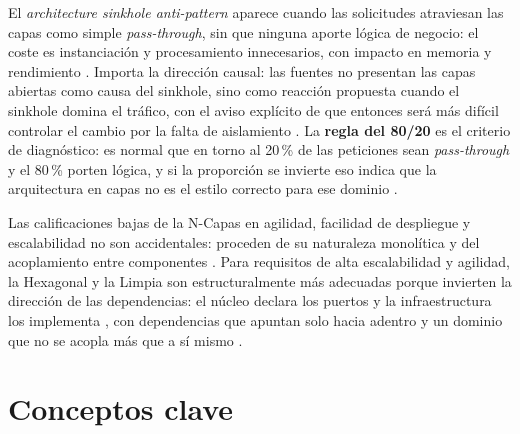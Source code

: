 El \emph{architecture sinkhole anti-pattern} aparece cuando las solicitudes atraviesan las capas
como simple \emph{pass-through}, sin que ninguna aporte lógica de negocio: el coste es
instanciación y procesamiento innecesarios, con impacto en memoria y rendimiento
\parencite[cap.~10]{richardsford2020}. Importa la dirección causal: las fuentes no presentan las
capas abiertas como causa del sinkhole, sino como reacción propuesta cuando el sinkhole domina
el tráfico, con el aviso explícito de que entonces será más difícil controlar el cambio por la
falta de aislamiento \parencite[7]{richards2015}. La \textbf{regla del 80/20} es el criterio de
diagnóstico: es normal que en torno al 20\,\% de las peticiones sean \emph{pass-through} y el
80\,\% porten lógica, y si la proporción se invierte eso indica que la arquitectura en capas no
es el estilo correcto para ese dominio \parencite[7]{richards2015}.

Las calificaciones bajas de la N-Capas en agilidad, facilidad de despliegue y escalabilidad no
son accidentales: proceden de su naturaleza monolítica y del acoplamiento entre componentes
\parencite[8-9]{richards2015}. Para requisitos de alta escalabilidad y agilidad, la Hexagonal y
la Limpia son estructuralmente más adecuadas porque invierten la dirección de las dependencias:
el núcleo declara los puertos y la infraestructura los implementa \parencite{cockburn2005}, con
dependencias que apuntan solo hacia adentro \parencite[203]{martin2017} y un dominio que no se
acopla más que a sí mismo \parencite{palermo2008}.

\section{Conceptos clave}

